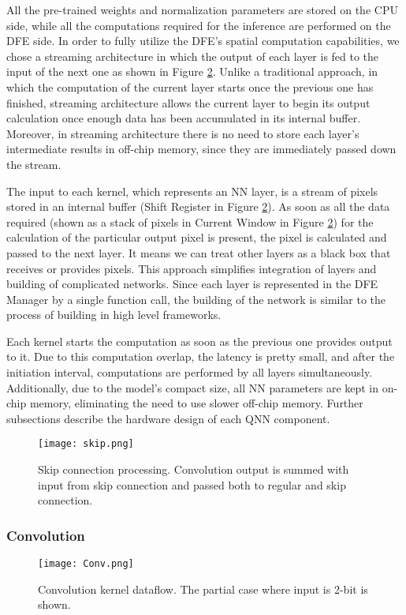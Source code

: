\documentclass[conference]{IEEEtran}
\begin{document}
	All the pre-trained weights and normalization parameters are stored on the CPU side, while all the computations required for the inference are performed on the DFE side. 
	In order to fully utilize the DFE's spatial computation capabilities, we chose a streaming architecture in which the output of each layer is fed to the input of the next one as shown in Figure \ref{conv}. Unlike a traditional approach, in which the computation of the current layer starts once the previous one has finished, streaming architecture allows the current layer to begin its output calculation once enough data has been accumulated in its internal buffer. Moreover, in streaming architecture there is no need to store each layer's intermediate results in off-chip memory, since they are immediately passed down the stream.  
	
	The input to each kernel, which represents an NN layer, is a stream of pixels stored in an internal buffer (Shift Register in Figure \ref{conv}). As soon as all the data required (shown as a stack of pixels in Current Window  in Figure \ref{conv}) for the calculation of the particular output pixel is present, the pixel is calculated and passed to the next layer. It means we can treat other layers as a black box that receives or provides pixels. This approach simplifies integration of layers and building of complicated networks. Since each layer is represented in the DFE Manager by a single function call, the  building of the network is similar to the process of building in high level frameworks.
	
	Each kernel starts the computation as soon as the previous one provides output to it. Due to this computation overlap, the latency is pretty small, and after the initiation interval, computations are performed by all layers simultaneously.   
	Additionally, due to the model's compact size, all NN parameters are kept in on-chip memory, eliminating the need to use slower off-chip memory. Further subsections describe the hardware design of each QNN component.
	
	\begin{figure}
		\centering
		\texttt{[image: skip.png]}
		\vspace{-1.2em}
		\caption{Skip connection processing. Convolution output is summed with input from skip connection and passed both to regular and skip connection.}
		\label{skip}
		\vspace{-1em}
	\end{figure}
	
	\subsubsection {Convolution} \label{conv_subs}
	\begin{figure}
		\centering
		\texttt{[image: Conv.png]}
		\vspace{-1.2em}
		\caption{Convolution kernel dataflow. The partial case where input is 2-bit is shown.}
		\label{conv}
		\vspace{-1em}
	\end{figure} 
	
\end{document}
